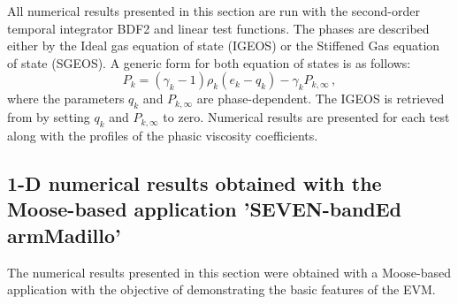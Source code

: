 \documentclass[preprint,10pt]{elsarticle}
\begin{document}
All numerical results presented in this section are run with the second-order 
temporal integrator BDF2 \cite{bdf2} and linear test functions. The phases are described either by the Ideal gas equation of state (IGEOS) or the Stiffened Gas equation 
of state (SGEOS). A generic form for both equation of states is as follows:
%
\begin{equation}\label{eq:generic-form}
P_k = (\gamma_k-1) \rho_k (e_k - q_k) - \gamma_k P_{k,\infty} \, ,
\end{equation}
%
where the parameters $q_k$ and $P_{k,\infty}$ are phase-dependent. The IGEOS is retrieved from  by setting $q_k$ and $P_{k,\infty}$ to 
zero. Numerical results are presented for each test along with the profiles of the phasic viscosity coefficients.
%
\subsection{1-D numerical results obtained with the Moose-based application 'SEVEN-bandEd armMadillo'}\label{sec:1d-results-sba}
%
The numerical results presented in this section were obtained with a Moose-based application with the objective of demonstrating the basic features of the EVM.
%
\end{document}
